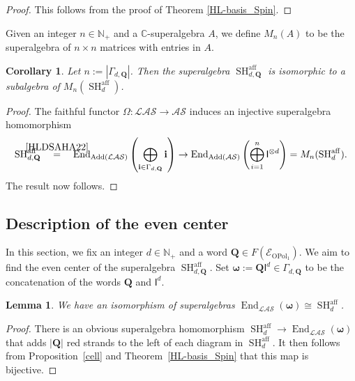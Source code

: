 \documentclass[11pt]{amsart}
\newcommand\go{\mathsf{I}}              %
\newtheorem{lem}[theo]{Lemma}
\newtheorem{cor}[theo]{Corollary}
\theoremstyle{definition}
\numberwithin{equation}{section}
\begin{document}
\begin{proof}
This follows from the proof of Theorem \ref{HL-basis_Spin}.
\end{proof}

Given an integer $ n \in \mathbb{N}_{+} $ and a $ \mathbb{C} $-superalgebra \(A\), we define $ M_{n}(A) $ to be the superalgebra of $ n \times n $ matrices with entries in \(A\).

\begin{cor}
Let $ n := |\Gamma_{d,\mathbf{Q}}| $. Then the superalgebra $ \operatorname{SH}^{\operatorname{aff}}_{d,\mathbf{Q}} $ is isomorphic to a subalgebra of $ M_{n}(\operatorname{SH}^{\operatorname{aff}}_{d}) $.
\end{cor}

\begin{proof}
The faithful functor $ \Omega \colon \mathcal{LAS} \rightarrow \mathcal{AS} $ induces an injective superalgebra homomorphism
\begin{equation*}
\operatorname{SH}_{d,\mathbf{Q}}^{\operatorname{aff}} \quad \stackrel{\mathclap{\cref{HLDSAHA22}}}{=} \quad \operatorname{End}_{\operatorname{Add}(\mathcal{LAS})}\left(\bigoplus_{\mathbf{i} \in \Gamma_{d,\mathbf{Q}}}\mathbf{i}\right) \rightarrow \operatorname{End}_{\operatorname{Add}(\mathcal{AS})}\left(\bigoplus_{i=1}^{n} \go^{\otimes d}\right) = M_{n}(\operatorname{SH}^{\operatorname{aff}}_{d}).
\end{equation*}
The result now follows.
\end{proof}

\subsection{Description of the even center} \label{h-affwreathcenter}

In this section, we fix an integer $ d \in \mathbb{N}_{+} $ and a word $ \mathbf{Q} \in F(\mathcal{E}_{\operatorname{OPol}_{1}}) $. We aim to find the even center of the superalgebra $ \operatorname{SH}^{\operatorname{aff}}_{d,\mathbf{Q}} $. Set $ \boldsymbol{\omega} := \mathbf{Q}\go^{d} \in \Gamma_{d,\mathbf{Q}} $ to be the concatenation of the words $ \mathbf{Q} $ and $ \go^{d} $.

\begin{lem} \label{salt3}
We have an isomorphism of superalgebras $ \operatorname{End}_{\mathcal{LAS}}(\boldsymbol{\omega}) \cong \operatorname{SH}^{\operatorname{aff}}_{d} $.
\end{lem}


\begin{proof}
There is an obvious superalgebra homomorphism $ \operatorname{SH}^{\operatorname{aff}}_{d} \rightarrow \operatorname{End}_{\mathcal{LAS}}(\boldsymbol{\omega}) $ that adds $ |\mathbf{Q}| $ red strands to the left of each diagram in $ \operatorname{SH}^{\operatorname{aff}}_{d} $. It then follows from Proposition~\ref{cell} and Theorem~\ref{HL-basis_Spin} that this map is bijective.
\end{proof}
\end{document}
